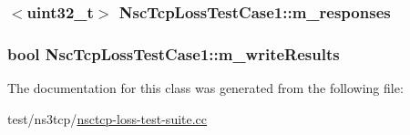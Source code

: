 \subsubsection[{\texorpdfstring{m\+\_\+responses}{m_responses}}]{$<$uint32\+\_\+t$>$ Nsc\+Tcp\+Loss\+Test\+Case1\+::m\+\_\+responses\hspace{0.3cm}{\ttfamily [private]}}\hypertarget{classNscTcpLossTestCase1_a8d7a9c86893918e88a071e5ab3899751}{}\label{classNscTcpLossTestCase1_a8d7a9c86893918e88a071e5ab3899751}
\subsubsection[{\texorpdfstring{m\+\_\+write\+Results}{m_writeResults}}]{\setlength{\rightskip}{0pt plus 5cm}bool Nsc\+Tcp\+Loss\+Test\+Case1\+::m\+\_\+write\+Results\hspace{0.3cm}{\ttfamily [private]}}\hypertarget{classNscTcpLossTestCase1_ae447c37356e0d5e4fe47ff37057fa346}{}\label{classNscTcpLossTestCase1_ae447c37356e0d5e4fe47ff37057fa346}


The documentation for this class was generated from the following file\+:\begin{DoxyCompactItemize}
\item 
test/ns3tcp/\hyperlink{nsctcp-loss-test-suite_8cc}{nsctcp-\/loss-\/test-\/suite.\+cc}\end{DoxyCompactItemize}
